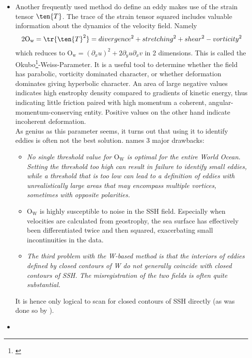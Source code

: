 \begin{itemize}
\item
Another frequently used method do define an eddy makes use of the strain tensor $\ten{T}$. The trace of the strain tensor squared includes
valuable information about the dynamics of the velocity field. Namely
\begin{equation}\begin{split}
	2\mathrm{O_w}=\tr{\ten{T}^2}
	=
	divergence^2
	+ stretching^2
	+ shear^2
	 - vorticity^2 \\
\end{split}\end{equation}
which reduces to $\mathrm{O_w}= \left(\partial_x u\right)^2+2 \partial_y u \partial_x v$ in 2 dimensions. This is called the
Okubo\footnote{\cite{Okubo1970}}-Weiss-Parameter. It is a useful tool to determine whether the field has parabolic, vorticity dominated character, or whether
deformation dominates giving hyperbolic character. An area of large negative values indicates high enstrophy density compared to gradients of kinetic energy,
thus indicating little friction paired with high momentum \ie a coherent, angular-momentum-conserving entity. Positive values on the other hand indicate
incoherent deformation.\\ As genius as this parameter seems, it turns out that using it to identify eddies is often not the best solution.
\citeauthor{Chelton2011} names 3 major drawbacks:
\begin{itemize}
	\item
	\textit{ No single threshold value for $\mathrm{O_W}$ is optimal for the entire World Ocean. Setting the threshold too high can result in failure to identify small eddies, while a threshold that is too low can lead to a definition of eddies with unrealistically large areas that may encompass multiple vortices, sometimes with opposite polarities. }
	\item
	$\mathrm{O_W}$ is highly susceptible to noise in the SSH field. Especially when velocities are calculated from geostrophy, the sea surface has effectively
been differentiated twice and then squared, exacerbating small incontinuities in the data.
	\item
	\textit{The third problem with the W-based method is that the interiors of eddies defined by closed contours of W do not generally coincide with closed contours of SSH. The misregistration of the two fields is often quite substantial. }
\end{itemize}
It is hence only logical to scan for closed contours of SSH directly (as was done so by \citeauthor{Chelton2011}).

\item
{}



\end{itemize}








